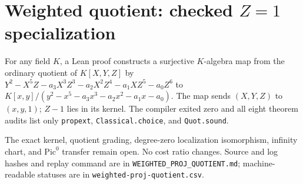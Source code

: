 \documentclass[11pt]{article}
\begin{document}
\section*{Weighted quotient: checked $Z=1$ specialization}
For any field $K$, a Lean proof constructs a surjective $K$-algebra map
from the ordinary quotient of $K[X,Y,Z]$ by
$Y^2-X^5Z-a_3X^3Z^3-a_2X^2Z^4-a_1XZ^5-a_0Z^6$
to $K[x,y]/(y^2-x^5-a_3x^3-a_2x^2-a_1x-a_0)$.
The map sends $(X,Y,Z)$ to $(x,y,1)$; $Z-1$ lies in its kernel.
The compiler exited zero and all eight theorem audits list only
\texttt{propext}, \texttt{Classical.choice}, and \texttt{Quot.sound}.

The exact kernel, quotient grading, degree-zero localization isomorphism,
infinity chart, and $\mathrm{Pic}^0$ transfer remain open. No cost ratio changes.
Source and log hashes and replay command are in \texttt{WEIGHTED\_PROJ\_QUOTIENT.md};
machine-readable statuses are in \texttt{weighted-proj-quotient.csv}.
\end{document}

